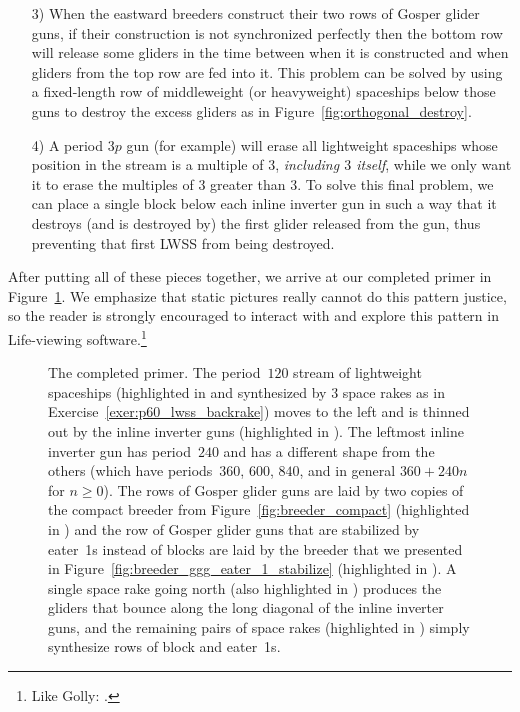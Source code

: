 \begin{enumerate}
	\item[3)] When the eastward breeders construct their two rows of Gosper glider guns, if their construction is not synchronized perfectly then the bottom row will release some gliders in the time between when it is constructed and when gliders from the top row are fed into it. This problem can be solved by using a fixed-length row of middleweight (or heavyweight) spaceships below those guns to destroy the excess gliders as in Figure~\ref{fig:orthogonal_destroy}.\smallskip
	
	\item[4)] A period $3p$ gun (for example) will erase all lightweight spaceships whose position in the stream is a multiple of $3$, \emph{including $3$ itself}, while we only want it to erase the multiples of $3$ greater than $3$. To solve this final problem, we can place a single block below each inline inverter gun in such a way that it destroys (and is destroyed by) the first glider released from the gun, thus preventing that first LWSS from being destroyed.\smallskip
\end{enumerate}

After putting all of these pieces together, we arrive at our completed primer in Figure~\ref{fig:primer}. We emphasize that static pictures really cannot do this pattern justice, so the reader is strongly encouraged to interact with and explore this pattern in Life-viewing software.\footnote{Like Golly: .}

\begin{figure}[!htb]
	\centering
	\caption{The completed primer. The period~$120$ stream of lightweight spaceships (highlighted in  and synthesized by $3$ space rakes as in Exercise~\ref{exer:p60_lwss_backrake}) moves to the left and is thinned out by the inline inverter guns (highlighted in ). The leftmost inline inverter gun has period~$240$ and has a different shape from the others (which have periods~$360$, $600$, $840$, and in general $360 + 240n$ for $n \geq 0$). The rows of Gosper glider guns are laid by two copies of the compact breeder from Figure~\ref{fig:breeder_compact} (highlighted in ) and the row of Gosper glider guns that are stabilized by eater~1s instead of blocks are laid by the breeder that we presented in Figure~\ref{fig:breeder_ggg_eater_1_stabilize} (highlighted in ). A single space rake going north (also highlighted in ) produces the gliders that bounce along the long diagonal of the inline inverter guns, and the remaining pairs of space rakes (highlighted in ) simply synthesize rows of block and eater~1s.}
	\label{fig:primer}
\end{figure}



